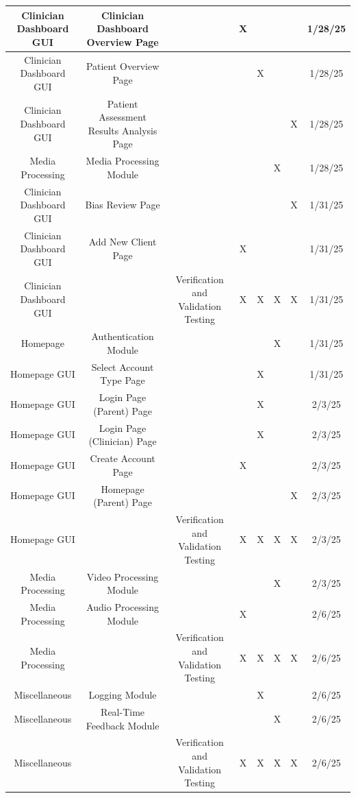 \documentclass[12pt, titlepage]{article}
\begin{document}
\begin{landscape}
\begin{longtable}{|c|c|c|c|c|c|c|c|}
      Clinician Dashboard GUI & Clinician Dashboard Overview Page & ~ & X & ~ & ~ & ~ & 1/28/25 \\ \hline
      Clinician Dashboard GUI & Patient Overview Page & ~ & ~ & X & ~ & ~ & 1/28/25 \\ \hline
      Clinician Dashboard GUI & Patient Assessment Results Analysis Page & ~ & ~ & ~ & ~ & X & 1/28/25 \\ \hline
      Media Processing & Media Processing Module & ~ & ~ & ~ & X & ~ & 1/28/25 \\ \hline
      Clinician Dashboard GUI & Bias Review Page & ~ & ~ & ~ & ~ & X & 1/31/25 \\ \hline
      Clinician Dashboard GUI & Add New Client Page & ~ & X & ~ & ~ & ~ & 1/31/25 \\ \hline
      Clinician Dashboard GUI & ~ & Verification and Validation Testing & X & X & X & X & 1/31/25 \\ \hline
      Homepage & Authentication Module & ~ & ~ & ~ & X & ~ & 1/31/25 \\ \hline
      Homepage GUI & Select Account Type Page & ~ & ~ & X & ~ & ~ & 1/31/25 \\ \hline
      Homepage GUI & Login Page (Parent) Page & ~ & ~ & X & ~ & ~ & 2/3/25 \\ \hline
      Homepage GUI & Login Page (Clinician) Page & ~ & ~ & X & ~ & ~ & 2/3/25 \\ \hline
      Homepage GUI & Create Account Page & ~ & X & ~ & ~ & ~ & 2/3/25 \\ \hline
      Homepage GUI & Homepage (Parent) Page & ~ & ~ & ~ & ~ & X & 2/3/25 \\ \hline
      Homepage GUI & ~ & Verification and Validation Testing & X & X & X & X & 2/3/25 \\ \hline
      Media Processing & Video Processing Module & ~ & ~ & ~ & X & ~ & 2/3/25 \\ \hline
      Media Processing & Audio Processing Module & ~ & X & ~ & ~ & ~ & 2/6/25 \\ \hline
      Media Processing & ~ & Verification and Validation Testing & X & X & X & X & 2/6/25 \\ \hline
      Miscellaneous & Logging Module & ~ & ~ & X & ~ & ~ & 2/6/25 \\ \hline
      Miscellaneous & Real-Time Feedback Module & ~ & ~ & ~ & X & ~ & 2/6/25 \\ \hline
      Miscellaneous & ~ & Verification and Validation Testing & X & X & X & X & 2/6/25 \\ \hline

\end{longtable}
\end{landscape}
\end{document}

